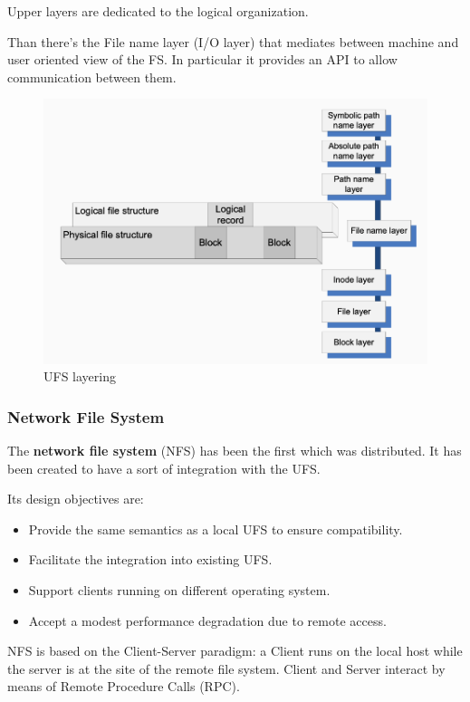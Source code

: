 Upper layers are dedicated to the logical organization.

Than there's the File name layer (I/O layer) that mediates between machine and user oriented view of the FS. In particular it provides an API to allow communication between them.

\begin{figure}[h!]
    \centering
    \includegraphics[scale=0.35]{images/UFSlayering.png}
    \caption{UFS layering}
    \label{fig:usfl}
\end{figure}


\subsubsection{Network File System}
The \textbf{network file system} (NFS) has been the first which was distributed. It has been created to have a sort of integration with the UFS.

Its design objectives are:
\begin{itemize}
    \item Provide the same semantics as a local UFS to ensure compatibility.
    \item Facilitate the integration into existing UFS.
    \item Support clients running on different operating system.
    \item Accept a modest performance degradation due to remote access.
\end{itemize}

NFS is based on the Client-Server paradigm: a Client runs on the local host while the server is at the site of the remote file system. Client and Server interact by means of Remote Procedure Calls (RPC).

